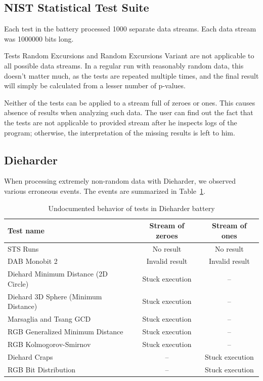 \documentclass[
	digital,    %
	oneside,    %
	color,
	11pt,
	nocover,
	notable,
	nolof,
	nolot,
]{fithesis3}
\theoremstyle{definition}
\theoremstyle{remark}
\begin{document}
\subsection*{NIST Statistical Test Suite}
Each test in the battery processed 1000 separate data streams. Each data stream was 1000000 bits long.

Tests Random Excursions and Random Excursions Variant are not applicable to all possible data streams. In a regular run with reasonably random data, this doesn't matter much, as the tests are repeated multiple times, and the final result will simply be calculated from a lesser number of p-values. 

Neither of the tests can be applied to a stream full of zeroes or ones. This causes absence of results when analyzing such data. The user can find out the fact that the tests are not applicable to provided stream after he inspects logs of the program; otherwise, the interpretation of the missing results is left to him.

\subsection*{Dieharder}
When processing extremely non-random data with Dieharder, we observed various erroneous events. The events are summarized in Table~\ref{tab:dieharder_errors}. 

\begin{table}[h!]
\begin{nomar}
\centering
\begin{tabular}{@{}lcc@{}} \toprule
\textbf{Test name}                   & \textbf{Stream of zeroes} & \textbf{Stream of ones} \\ \midrule
STS Runs                             & No result                & No result                \\
DAB Monobit 2 						 & Invalid result           & Invalid result           \\
Diehard Minimum Distance (2D Circle) & Stuck execution          & --                        \\
Diehard 3D Sphere (Minimum Distance) & Stuck execution          & --                        \\
Marsaglia and Tsang GCD              & Stuck execution          & --                        \\
RGB Generalized Minimum Distance     & Stuck execution          & --                        \\
RGB Kolmogorov-Smirnov               & Stuck execution          & --                        \\  
Diehard Craps                        & --                       & Stuck execution          \\
RGB Bit Distribution                 & --                       & Stuck execution          \\ \bottomrule
\end{tabular}
\end{nomar}
\caption{Undocumented behavior of tests in Dieharder battery}
\label{tab:dieharder_errors}
\end{table}
\end{document}
